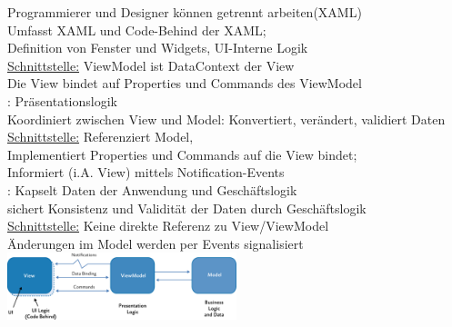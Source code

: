 Programmierer und Designer können getrennt arbeiten(XAML)\\
 Umfasst XAML und Code-Behind der XAML; \\
Definition von Fenster und Widgets, UI-Interne Logik\\
\underline{Schnittstelle:} ViewModel ist DataContext der View\\
Die View bindet auf Properties und Commands des ViewModel\\
: Präsentationslogik \\
Koordiniert zwischen View und Model: Konvertiert, verändert, validiert Daten\\
\underline{Schnittstelle:} Referenziert Model, \\
Implementiert Properties und Commands auf die View bindet;\\
Informiert (i.A. View) mittels Notification-Events \\
: Kapselt Daten der Anwendung und Geschäftslogik\\
sichert Konsistenz und Validität der Daten durch Geschäftslogik\\
\underline{Schnittstelle:} Keine direkte Referenz zu View/ViewModel\\ 
Änderungen im Model werden per Events signalisiert\\
\includegraphics[width=0.5\textwidth]{MVVM}




